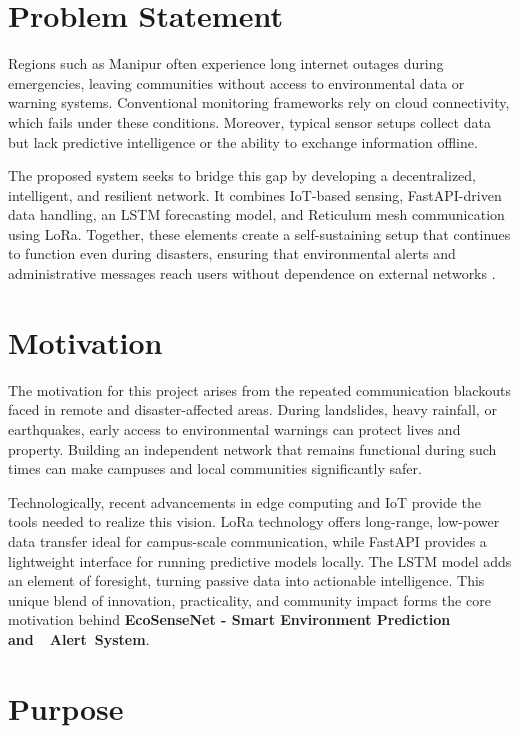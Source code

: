 \section{Problem Statement}

Regions such as Manipur often experience long internet outages during emergencies, leaving communities without access to environmental data or warning systems. Conventional monitoring frameworks rely on cloud connectivity, which fails under these conditions. Moreover, typical sensor setups collect data but lack predictive intelligence or the ability to exchange information offline.

The proposed system seeks to bridge this gap by developing a decentralized, intelligent, and resilient network. It combines IoT-based sensing, FastAPI-driven data handling, an LSTM forecasting model, and Reticulum mesh communication using LoRa. Together, these elements create a self-sustaining setup that continues to function even during disasters, ensuring that environmental alerts and administrative messages reach users without dependence on external networks \cite{lora_emergency_communication}.

\section{Motivation}

The motivation for this project arises from the repeated communication blackouts faced in remote and disaster-affected areas. During landslides, heavy rainfall, or earthquakes, early access to environmental warnings can protect lives and property. Building an independent network that remains functional during such times can make campuses and local communities significantly safer.

Technologically, recent advancements in edge computing and IoT provide the tools needed to realize this vision. LoRa technology offers long-range, low-power data transfer ideal for campus-scale communication, while FastAPI provides a lightweight interface for running predictive models locally. The LSTM model adds an element of foresight, turning passive data into actionable intelligence. This unique blend of innovation, practicality, and community impact forms the core motivation behind \textbf{EcoSenseNet - Smart Environment Prediction and  Alert System}.

\section{Purpose}

